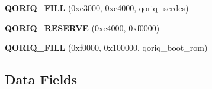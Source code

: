 \begin{DoxyCompactItemize}
\item 
\mbox{\label{structqoriq__ccsr_a85e4916d85a4a642a20e4a0656919c9b}} 
{\bfseries Q\+O\+R\+I\+Q\+\_\+\+F\+I\+LL} (0xe3000, 0xe4000, qoriq\+\_\+serdes)
\item 
\mbox{\label{structqoriq__ccsr_ae1f426872267c412c5be39d5fe55dbad}} 
{\bfseries Q\+O\+R\+I\+Q\+\_\+\+R\+E\+S\+E\+R\+VE} (0xe4000, 0xf0000)
\item 
\mbox{\label{structqoriq__ccsr_aa25f14b959e5ae60871ec8c38da32133}} 
{\bfseries Q\+O\+R\+I\+Q\+\_\+\+F\+I\+LL} (0xf0000, 0x100000, qoriq\+\_\+boot\+\_\+rom)
\end{DoxyCompactItemize}
\subsection*{Data Fields}
